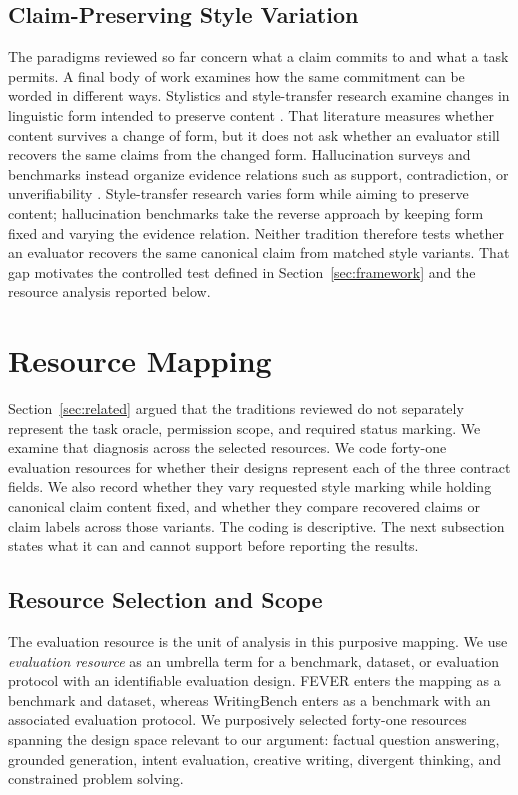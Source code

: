 \documentclass{clv2025}
\begin{document}
\subsection{Claim-Preserving Style Variation}
The paradigms reviewed so far concern what a claim commits to and what a task
permits. A final body of work examines how the same commitment can be worded in
different ways.
Stylistics and style-transfer research examine changes in linguistic form
intended to preserve content
\citep{leech_short_style_1981,vanpeer_stylistics_2020,pavlick_empirical_2016,rao_dear_2018,briakou_evaluating_2021}.
That literature measures whether content survives a change of form, but it does
not ask whether an evaluator still recovers the same claims from the changed
form.
Hallucination surveys and benchmarks instead organize evidence relations such
as support, contradiction, or unverifiability
\citep{ji_survey_2023,huang_survey_2025,bang_hallulens_2025}.
Style-transfer research varies form while aiming to preserve content;
hallucination benchmarks take the reverse approach by keeping form fixed and
varying the evidence relation.
Neither tradition therefore tests whether an evaluator recovers the same
canonical claim from matched style variants.
That gap motivates the controlled test defined in
Section~\ref{sec:framework} and the resource analysis reported below.

\section{Resource Mapping}\label{sec:methodology}

Section~\ref{sec:related} argued that the traditions reviewed do not separately
represent the task oracle, permission scope, and required status marking.
We examine that diagnosis across the selected resources.
We code forty-one evaluation resources for whether their designs represent each
of the three contract fields. We also record whether they vary requested style
marking while holding canonical claim content fixed, and whether they compare
recovered claims or claim labels across those variants.
The coding is descriptive. The next subsection states what it can and cannot
support before reporting the results.

\subsection{Resource Selection and Scope}

The evaluation resource is the unit of analysis in this purposive mapping.
We use \emph{evaluation resource} as an umbrella term for a benchmark, dataset,
or evaluation protocol with an identifiable evaluation design.
FEVER enters the mapping as a benchmark and dataset, whereas WritingBench enters
as a benchmark with an associated evaluation protocol.
We purposively selected forty-one resources spanning the design space relevant
to our argument: factual question answering, grounded generation, intent
evaluation, creative writing, divergent thinking, and constrained problem
solving.
\end{document}
